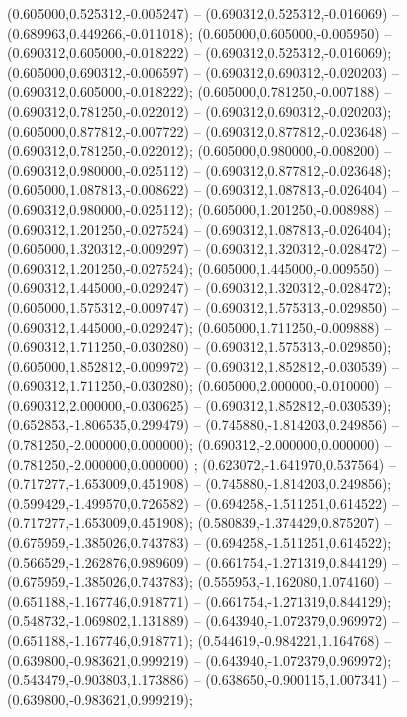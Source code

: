  (0.605000,0.525312,-0.005247) -- (0.690312,0.525312,-0.016069) -- (0.689963,0.449266,-0.011018);
 (0.605000,0.605000,-0.005950) -- (0.690312,0.605000,-0.018222) -- (0.690312,0.525312,-0.016069);
 (0.605000,0.690312,-0.006597) -- (0.690312,0.690312,-0.020203) -- (0.690312,0.605000,-0.018222);
 (0.605000,0.781250,-0.007188) -- (0.690312,0.781250,-0.022012) -- (0.690312,0.690312,-0.020203);
 (0.605000,0.877812,-0.007722) -- (0.690312,0.877812,-0.023648) -- (0.690312,0.781250,-0.022012);
 (0.605000,0.980000,-0.008200) -- (0.690312,0.980000,-0.025112) -- (0.690312,0.877812,-0.023648);
 (0.605000,1.087813,-0.008622) -- (0.690312,1.087813,-0.026404) -- (0.690312,0.980000,-0.025112);
 (0.605000,1.201250,-0.008988) -- (0.690312,1.201250,-0.027524) -- (0.690312,1.087813,-0.026404);
 (0.605000,1.320312,-0.009297) -- (0.690312,1.320312,-0.028472) -- (0.690312,1.201250,-0.027524);
 (0.605000,1.445000,-0.009550) -- (0.690312,1.445000,-0.029247) -- (0.690312,1.320312,-0.028472);
 (0.605000,1.575312,-0.009747) -- (0.690312,1.575313,-0.029850) -- (0.690312,1.445000,-0.029247);
 (0.605000,1.711250,-0.009888) -- (0.690312,1.711250,-0.030280) -- (0.690312,1.575313,-0.029850);
 (0.605000,1.852812,-0.009972) -- (0.690312,1.852812,-0.030539) -- (0.690312,1.711250,-0.030280);
 (0.605000,2.000000,-0.010000) -- (0.690312,2.000000,-0.030625) -- (0.690312,1.852812,-0.030539);
 (0.652853,-1.806535,0.299479) -- (0.745880,-1.814203,0.249856) -- (0.781250,-2.000000,0.000000);
 (0.690312,-2.000000,0.000000) -- (0.781250,-2.000000,0.000000) ;
 (0.623072,-1.641970,0.537564) -- (0.717277,-1.653009,0.451908) -- (0.745880,-1.814203,0.249856);
 (0.599429,-1.499570,0.726582) -- (0.694258,-1.511251,0.614522) -- (0.717277,-1.653009,0.451908);
 (0.580839,-1.374429,0.875207) -- (0.675959,-1.385026,0.743783) -- (0.694258,-1.511251,0.614522);
 (0.566529,-1.262876,0.989609) -- (0.661754,-1.271319,0.844129) -- (0.675959,-1.385026,0.743783);
 (0.555953,-1.162080,1.074160) -- (0.651188,-1.167746,0.918771) -- (0.661754,-1.271319,0.844129);
 (0.548732,-1.069802,1.131889) -- (0.643940,-1.072379,0.969972) -- (0.651188,-1.167746,0.918771);
 (0.544619,-0.984221,1.164768) -- (0.639800,-0.983621,0.999219) -- (0.643940,-1.072379,0.969972);
 (0.543479,-0.903803,1.173886) -- (0.638650,-0.900115,1.007341) -- (0.639800,-0.983621,0.999219);

